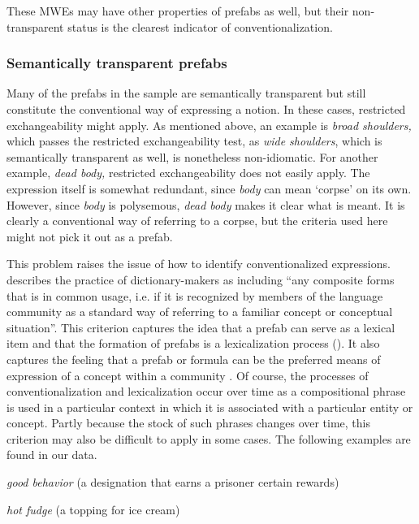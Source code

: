 \documentclass[output=paper]{langscibook}
\begin{document}
These MWEs may have other properties of prefabs as well, but their non-transparent status is the clearest indicator of conventionalization. 

\subsubsection{Semantically transparent prefabs}\label{sec:bybee:3.1.3}

Many of the prefabs in the sample are semantically transparent but still constitute the conventional way of expressing a notion. In these cases, restricted exchangeability might apply. As mentioned above, an example is \textit{broad shoulders,} which passes the restricted exchangeability test, as \textit{wide shoulders}, which is semantically transparent as well, is nonetheless non-idiomatic. For another example, \textit{dead body,} restricted exchangeability does not easily apply. The expression itself is somewhat redundant, since \textit{body} can mean ‘corpse’ on its own. However, since \textit{body} is polysemous, \textit{dead body} makes it clear what is meant. It is clearly a conventional way of referring to a corpse, but the criteria used here might not pick it out as a prefab. 

This problem raises the issue of how to identify conventionalized expressions. \citet[101]{Pawley1986} describes the practice of dictionary-makers as including ``any composite forms that is in common usage, i.e. if it is recognized by members of the language community as a standard way of referring to a familiar concept or conceptual situation''. This criterion captures the idea that a prefab can serve as a lexical item and that the formation of prefabs is a lexicalization process (\citealt{BrintonTraugott2005}). It also captures the feeling that a prefab or formula can be the preferred means of expression of a concept within a community \citep{Wray2002,CorriganEtAl2009}. Of course, the processes of conventionalization and lexicalization occur over time as a compositional phrase is used in a particular context in which it is associated with a particular entity or concept. Partly because the stock of such phrases changes over time, this criterion may also be difficult to apply in some cases. The following examples are found in our data.

\ea\label{ex:bybee:5}
\textit{good behavior} (a designation that earns a prisoner certain rewards)

\textit{hot fudge} (a topping for ice cream)
\end{document}

